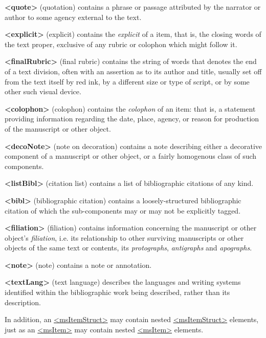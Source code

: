 \begin{sansreflist}
\item [\textbf{<quote>}] (quotation) contains a phrase or passage attributed by the narrator or author to some agency external to the text.
\item [\textbf{<explicit>}] (explicit) contains the \textit{explicit} of a item, that is, the closing words of the text proper, exclusive of any rubric or colophon which might follow it.
\item [\textbf{<finalRubric>}] (final rubric) contains the string of words that denotes the end of a text division, often with an assertion as to its author and title, usually set off from the text itself by red ink, by a different size or type of script, or by some other such visual device.
\item [\textbf{<colophon>}] (colophon) contains the \textit{colophon} of an item: that is, a statement providing information regarding the date, place, agency, or reason for production of the manuscript or other object.
\item [\textbf{<decoNote>}] (note on decoration) contains a note describing either a decorative component of a manuscript or other object, or a fairly homogenous class of such components.
\item [\textbf{<listBibl>}] (citation list) contains a list of bibliographic citations of any kind.
\item [\textbf{<bibl>}] (bibliographic citation) contains a loosely-structured bibliographic citation of which the sub-components may or may not be explicitly tagged.
\item [\textbf{<filiation>}] (filiation) contains information concerning the manuscript or other object's \textit{filiation}, i.e. its relationship to other surviving manuscripts or other objects of the same text or contents, its \textit{protographs}, \textit{antigraphs} and \textit{apographs}.
\item [\textbf{<note>}] (note) contains a note or annotation.
\item [\textbf{<textLang>}] (text language) describes the languages and writing systems identified within the bibliographic work being described, rather than its description.
\end{sansreflist}
\par
In addition, an \hyperref[TEI.msItemStruct]{<msItemStruct>} may contain nested \hyperref[TEI.msItemStruct]{<msItemStruct>} elements, just as an \hyperref[TEI.msItem]{<msItem>} may contain nested \hyperref[TEI.msItem]{<msItem>} elements.\par

